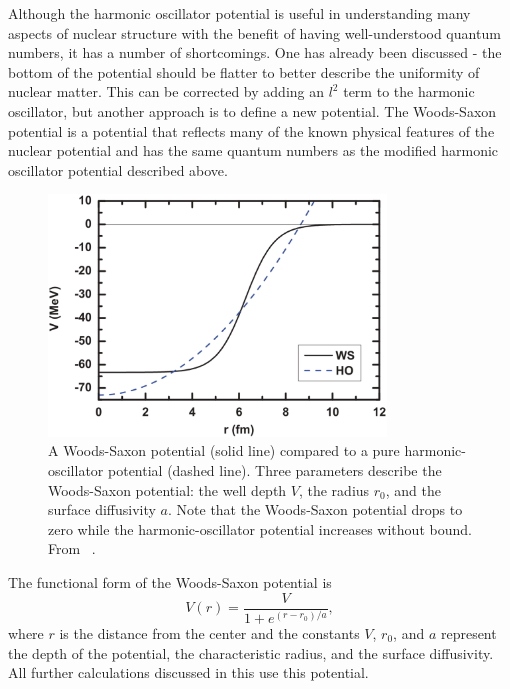 Although the harmonic oscillator potential is useful in understanding many aspects of nuclear structure with the benefit of having well-understood quantum numbers, it has a number of shortcomings.  One has already been discussed - the bottom of the potential should be flatter to better describe the uniformity of nuclear matter.  This can be corrected by adding an $l^2$ term to the harmonic oscillator, but another approach is to define a new potential.  The Woods-Saxon potential \citep{WoodsSaxon} is a potential that reflects many of the known physical features of the nuclear potential and has the same quantum numbers as the modified harmonic oscillator potential described above.
\begin{figure}[htp]
\centering
\includegraphics[width=0.8\textwidth]{figures/woodsSaxonVSharmonicOsc.eps}
\caption[The Woods-Saxon nuclear potential.]{A Woods-Saxon potential (solid line) compared to a pure harmonic-oscillator potential (dashed line).  Three parameters describe the Woods-Saxon potential: the well depth $V$, the radius $r_0$, and the surface diffusivity $a$.  Note that the Woods-Saxon potential drops to zero while the harmonic-oscillator potential increases without bound.  From {}~\citep{pseudospinSymmetry}.}
\label{fig:woodsSaxon}
\end{figure}
The functional form of the Woods-Saxon potential is 
\begin{equation}
V(r) = \frac{V}{1+e^{(r-r_0)/a}},
\end{equation}
where $r$ is the distance from the center and the constants $V$, $r_0$, and $a$ represent the depth of the potential, the characteristic radius, and the surface diffusivity.  All further calculations discussed in this use this potential.

